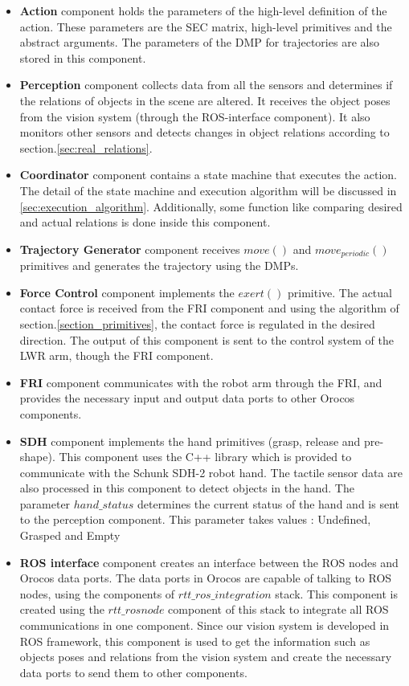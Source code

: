 \begin{itemize}
 \item{\textbf{Action}}
component holds the parameters of the high-level definition of the action.
These parameters are the SEC matrix, high-level primitives and the abstract arguments.
The parameters of the DMP for trajectories are also stored in this component.
\item{\textbf{Perception}}
component collects data from all the sensors and determines if the relations of objects in the scene are altered.
It receives the object poses from the vision system (through the ROS-interface component).
It also monitors other sensors and detects changes in object relations according to section.\ref{sec:real_relations}.
\item{\textbf{Coordinator}}
component contains a state machine that executes the action.
The detail of the state machine and execution algorithm will be discussed in \ref{sec:execution_algorithm}.
Additionally, some function like comparing desired and actual relations is done inside this component.

\item{\textbf{Trajectory Generator}}
component receives $move()$ and $move_{periodic}()$ primitives and generates the trajectory using the DMPs.

\item{\textbf{Force Control}}
component implements the $exert()$ primitive.
The actual contact force is received from the FRI component and using the algorithm of section.\ref{section_primitives},
the contact force is regulated in the desired direction.
The output of this component is sent to the control system of the LWR arm, though the FRI component.

\item{\textbf{FRI}}
component communicates with the robot arm through the FRI,
and provides the necessary input and output data ports to other Orocos components.

\item{\textbf{SDH}}
component implements the hand primitives (grasp, release and pre-shape).
This component uses the C++ library which is provided to communicate with the Schunk SDH-2 robot hand.
The tactile sensor data are also processed in this component to detect objects in the hand.
The parameter $hand\_status$ determines the current status of the hand and is sent to the perception component.
This parameter takes values : Undefined, Grasped and Empty

\item{\textbf{ROS interface}}
component creates an interface between the ROS nodes and Orocos data ports.
The data ports in Orocos are capable of talking to ROS nodes, using the components of $rtt\_ros\_integration$ stack.
This component is created using the $rtt\_rosnode$ component of this stack to integrate all ROS communications in one component.
Since our vision system is developed in ROS framework, this component is used to get the information such as 
objects poses and relations from the vision system and create the necessary data ports to send them to other components.
\end{itemize}

